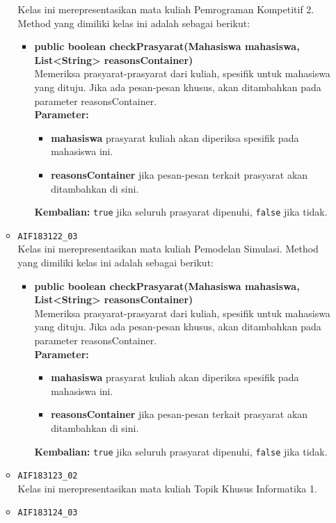 \begin{enumerate}
\begin{itemize}
		Kelas ini merepresentasikan mata kuliah Pemrograman Kompetitif 2. Method yang dimiliki kelas ini adalah sebagai berikut: 
		\begin{itemize}
			\item \textbf{public boolean checkPrasyarat(Mahasiswa mahasiswa, List<String> reasonsContainer)}\\
			Memeriksa prasyarat-prasyarat dari kuliah, spesifik untuk mahasiswa yang dituju. Jika ada pesan-pesan khusus, akan ditambahkan pada parameter reasonsContainer.\\
			\textbf{Parameter:}
			\begin{itemize}
				\item \textbf{mahasiswa} prasyarat kuliah akan diperiksa spesifik pada mahasiswa ini.
				\item \textbf{reasonsContainer} jika pesan-pesan terkait prasyarat akan ditambahkan di sini.
			\end{itemize}
			\textbf{Kembalian:} \texttt{true} jika seluruh prasyarat dipenuhi, \texttt{false} jika tidak.
		\end{itemize}
		\item \texttt{AIF183122\_03} \\
		Kelas ini merepresentasikan mata kuliah Pemodelan Simulasi. Method yang dimiliki kelas ini adalah sebagai berikut: 
		\begin{itemize}
			\item \textbf{public boolean checkPrasyarat(Mahasiswa mahasiswa, List<String> reasonsContainer)}\\
			Memeriksa prasyarat-prasyarat dari kuliah, spesifik untuk mahasiswa yang dituju. Jika ada pesan-pesan khusus, akan ditambahkan pada parameter reasonsContainer.\\
			\textbf{Parameter:}
			\begin{itemize}
				\item \textbf{mahasiswa} prasyarat kuliah akan diperiksa spesifik pada mahasiswa ini.
				\item \textbf{reasonsContainer} jika pesan-pesan terkait prasyarat akan ditambahkan di sini.
			\end{itemize}
			\textbf{Kembalian:} \texttt{true} jika seluruh prasyarat dipenuhi, \texttt{false} jika tidak.
		\end{itemize}
		\item \texttt{AIF183123\_02} \\
		Kelas ini merepresentasikan mata kuliah Topik Khusus Informatika 1.
		\item \texttt{AIF183124\_03} \\

\end{itemize}
\end{enumerate}
